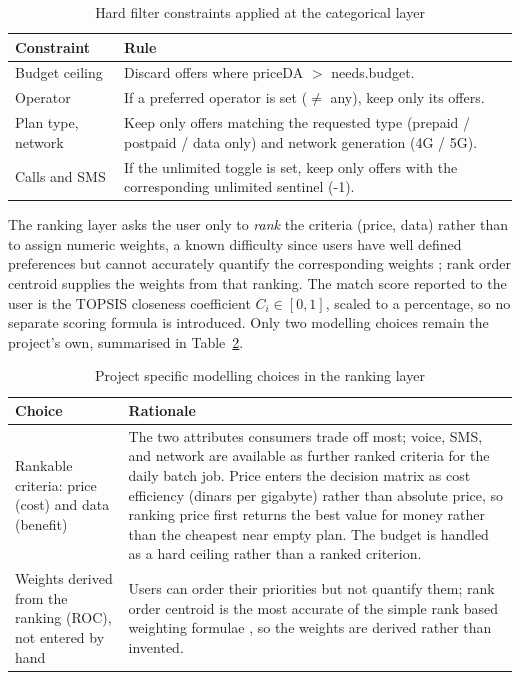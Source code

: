 \begin{table}[H]
  \caption{Hard filter constraints applied at the categorical layer}
  \label{tab:hard-filters}
  \centering\small
  \begin{tabular}{|p{3.0cm}|p{10.3cm}|}
    \hline
    \textbf{Constraint} & \textbf{Rule} \\ \hline
    Budget ceiling & Discard offers where priceDA $>$ needs.budget. \\ \hline
    Operator       & If a preferred operator is set ($\neq$ \guillemotleft{}any\guillemotright{}), keep only its offers. \\ \hline
    Plan type, network & Keep only offers matching the requested type (prepaid / postpaid / data only) and network generation (4G / 5G). \\ \hline
    Calls and SMS  & If the \guillemotleft{}unlimited\guillemotright{} toggle is set, keep only offers with the corresponding unlimited sentinel (-1). \\ \hline
  \end{tabular}
\end{table}

The ranking layer asks the user only to \emph{rank} the criteria (price, data) rather than to assign numeric weights, a known difficulty since users have well defined preferences but cannot accurately quantify the corresponding weights \parencite{BarronBarrett1996}; rank order centroid supplies the weights from that ranking. The match score reported to the user is the TOPSIS closeness coefficient $C_i \in [0,1]$, scaled to a percentage, so no separate scoring formula is introduced. Only two modelling choices remain the project's own, summarised in Table~\ref{tab:rec-params}.

\begin{table}[H]
  \caption{Project specific modelling choices in the ranking layer}
  \label{tab:rec-params}
  \centering\small
  \begin{tabular}{|p{3.4cm}|p{9.9cm}|}
    \hline
    \textbf{Choice} & \textbf{Rationale} \\ \hline
    Rankable criteria: price (cost) and data (benefit) & The two attributes consumers trade off most; voice, SMS, and network are available as further ranked criteria for the daily batch job. Price enters the decision matrix as cost efficiency (dinars per gigabyte) rather than absolute price, so ranking price first returns the best value for money rather than the cheapest near empty plan. The budget is handled as a hard ceiling rather than a ranked criterion. \\ \hline
    Weights derived from the ranking (ROC), not entered by hand & Users can order their priorities but not quantify them; rank order centroid is the most accurate of the simple rank based weighting formulae \parencite{BarronBarrett1996}, so the weights are derived rather than invented. \\ \hline
  \end{tabular}
\end{table}

